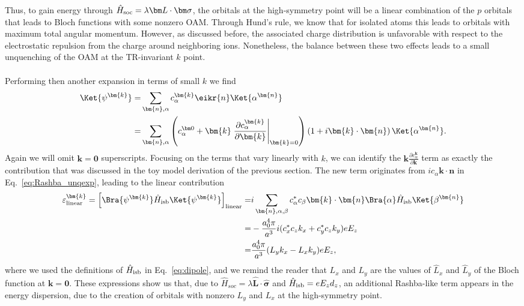 Thus, to gain energy through $\hat{H}_{\rm soc} = \lambda \bm L \cdot \bm \sigma$, the orbitals at the high-symmetry point will be a linear combination of the $p$ orbitals that leads to Bloch functions with some nonzero OAM.
Through Hund's rule, we know that for isolated atoms this leads to orbitals with maximum total angular momentum.
However, as discussed before, the associated charge distribution is unfavorable with respect to the electrostatic repulsion from the charge around neighboring ions.
Nonetheless, the balance between these two effects leads to a small unquenching of the OAM at the TR-invariant $k$ point. 
\\\\
Performing then another expansion in terms of small $k$ we find
\begin{align}
	\Ket{\psi^{\bm{k}}} =& \sum_{\bm{n},\alpha} c_\alpha^{\bm{k}} \eikr{n} \Ket{\alpha^{\bm{n}}}\\
	=& \sum_{\bm{n},\alpha} \left(c_\alpha^{\bm 0} + \bm{k}\left.\frac{\partial c_\alpha^{\bm{k}}}{\partial \bm{k}}\right\rvert_{\bm{k}=0} \right)\left(1 + i\bm{k}\cdot\bm{n}\right)\Ket{\alpha^{\bm{n}}}\label{eq:Rashba_unqexp}.
\end{align}
Again we will omit $\bm{k}=\bm 0$ superscripts.
Focusing on the terms that vary linearly with $k$, we can identify the $\bm k \frac{\partial c_\alpha^{\bm k}}{\partial \bm k}$ term as exactly the contribution that was discussed in the toy model derivation of the previous section.
The new term originates from $ic_\alpha \bm k \cdot \bm n$ in Eq.~\eqref{eq:Rashba_unqexp}, leading to the linear contribution
\begin{align}
	\label{eq:d_z_from_OAM}
	\varepsilon^{\bm{k}}_{\rm linear} = \left[\Bra{\psi^{\bm{k}}} \hat{H}_{\rm isb} \Ket{\psi^{\bm{k}}}\right]_{\rm linear} =&  i\sum_{\bm{n},\alpha,\beta} c_\alpha^* c_\beta \bm{k}\cdot\bm{n}\Bra{\alpha} \hat{H}_{\rm isb} \Ket{\beta^{\bm{n}}}\\
	=&-\frac{a_0^4 \pi}{a^3}i(c^*_xc_zk_x + c^*_yc_z k_y) e E_z  \\
	=&\frac{a_0^4 \pi}{a^3}(L_y k_x - L_x k_y) e E_z,
\end{align}
where we used the definitions of $\hat{H}_{\rm isb}$ in Eq.~\eqref{eq:dipole}, and we remind the reader that $L_x$ and $L_y$ are the values of $\hat{L}_x$ and $\hat{L}_y$ of the Bloch function at $\bm k = \bm 0$.
These expressions show us that, due to ${\hat{H}_{soc} = \lambda \hat{\bm{L}}\cdot\hat{\bm{\sigma}}}$ and $\hat{H}_{\rm isb} = e E_z d_z$, an additional Rashba-like term appears in the energy dispersion, due to the creation of orbitals with nonzero $L_y$ and $L_x$ at the high-symmetry point.

